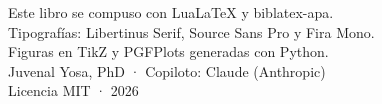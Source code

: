 \cleardoublepage
\thispagestyle{empty}
\vspace*{\fill}
\begin{center}
\par\bigskip
{\sffamily\small\color{tinta2}
Este libro se compuso con Lua\LaTeX{} y biblatex-apa.\\
Tipografías: Libertinus Serif, Source Sans Pro y Fira Mono.\\
Figuras en TikZ y PGFPlots generadas con Python.\\[6pt]
Juvenal Yosa, PhD · Copiloto: Claude (Anthropic)\\
Licencia MIT · 2026}
\end{center}
\vspace*{\fill}
